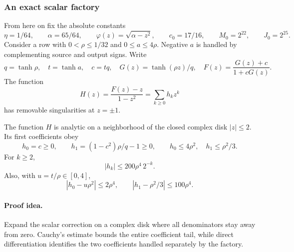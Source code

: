 \subsubsection{An exact scalar factory}

From here on fix the absolute constants
\[
 \eta=1/64,\qquad \alpha=65/64,\qquad
 \varphi(z)=\sqrt{\alpha-z^2},\qquad
 c_0=17/16,\qquad M_0=2^{22},\qquad J_0=2^{25}.
\]
Consider a row with \(0<\rho\le1/32\) and \(0\le a\le4\rho\).
Negative \(a\) is handled by complementing source and output signs.
Write
\[
 q=\tanh\rho,\quad t=\tanh a,\quad c=tq,\quad
 G(z)=\tanh(\rho z)/q,\quad
 F(z)=\frac{G(z)+c}{1+cG(z)}.
\]
The function
\[
 H(z)=\frac{F(z)-z}{1-z^2}=\sum_{k\ge0}h_kz^k
\]
has removable singularities at \(z=\pm1\).

\begin{lemma}\label{lem:fusedcoeff}
The function \(H\) is analytic on a neighborhood of the closed
complex disk \(|z|\le2\). Its first coefficients obey
\[
 h_0=c\ge0,\qquad h_1=(1-c^2)\rho/q-1\ge0,
 \qquad h_0\le4\rho^2,\quad h_1\le\rho^2/3.
\]
For \(k\ge2\),
\begin{equation}\label{eq:fusedtail}
 |h_k|\le200\rho^4\,2^{-k}.
\end{equation}
Also, with \(u=t/\rho\in[0,4]\),
\[
 |h_0-u\rho^2|\le2\rho^4,
 \qquad |h_1-\rho^2/3|\le100\rho^4.
\]
\end{lemma}
\paragraph{Proof idea.}
Expand the scalar correction on a complex disk where all denominators stay
away from zero. Cauchy's estimate bounds the entire coefficient tail, while
direct differentiation identifies the two coefficients handled separately by
the factory.

